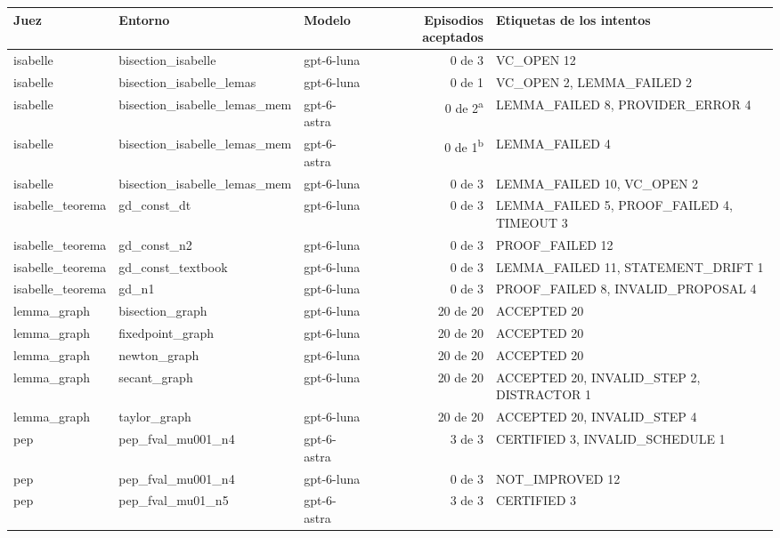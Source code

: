 \begin{tabular}{@{}lllr>{\raggedright\arraybackslash}p{5.0cm}@{}}
\toprule
Juez & Entorno & Modelo & Episodios aceptados & Etiquetas de los intentos\\
\midrule
isabelle & bisection\_isabelle & gpt-6-luna & 0 de 3 & {\footnotesize VC\_OPEN 12}\\
isabelle & bisection\_isabelle\_lemas & gpt-6-luna & 0 de 1 & {\footnotesize VC\_OPEN 2, LEMMA\_FAILED 2}\\
isabelle & bisection\_isabelle\_lemas\_mem & gpt-6-astra & 0 de 2\textsuperscript{a} & {\footnotesize LEMMA\_FAILED 8, PROVIDER\_ERROR 4}\\
isabelle & bisection\_isabelle\_lemas\_mem & gpt-6-astra & 0 de 1\textsuperscript{b} & {\footnotesize LEMMA\_FAILED 4}\\
isabelle & bisection\_isabelle\_lemas\_mem & gpt-6-luna & 0 de 3 & {\footnotesize LEMMA\_FAILED 10, VC\_OPEN 2}\\
isabelle\_teorema & gd\_const\_dt & gpt-6-luna & 0 de 3 & {\footnotesize LEMMA\_FAILED 5, PROOF\_FAILED 4, TIMEOUT 3}\\
isabelle\_teorema & gd\_const\_n2 & gpt-6-luna & 0 de 3 & {\footnotesize PROOF\_FAILED 12}\\
isabelle\_teorema & gd\_const\_textbook & gpt-6-luna & 0 de 3 & {\footnotesize LEMMA\_FAILED 11, STATEMENT\_DRIFT 1}\\
isabelle\_teorema & gd\_n1 & gpt-6-luna & 0 de 3 & {\footnotesize PROOF\_FAILED 8, INVALID\_PROPOSAL 4}\\
lemma\_graph & bisection\_graph & gpt-6-luna & 20 de 20 & {\footnotesize ACCEPTED 20}\\
lemma\_graph & fixedpoint\_graph & gpt-6-luna & 20 de 20 & {\footnotesize ACCEPTED 20}\\
lemma\_graph & newton\_graph & gpt-6-luna & 20 de 20 & {\footnotesize ACCEPTED 20}\\
lemma\_graph & secant\_graph & gpt-6-luna & 20 de 20 & {\footnotesize ACCEPTED 20, INVALID\_STEP 2, DISTRACTOR 1}\\
lemma\_graph & taylor\_graph & gpt-6-luna & 20 de 20 & {\footnotesize ACCEPTED 20, INVALID\_STEP 4}\\
pep & pep\_fval\_mu001\_n4 & gpt-6-astra & 3 de 3 & {\footnotesize CERTIFIED 3, INVALID\_SCHEDULE 1}\\
pep & pep\_fval\_mu001\_n4 & gpt-6-luna & 0 de 3 & {\footnotesize NOT\_IMPROVED 12}\\
pep & pep\_fval\_mu01\_n5 & gpt-6-astra & 3 de 3 & {\footnotesize CERTIFIED 3}\\

\end{tabular}
